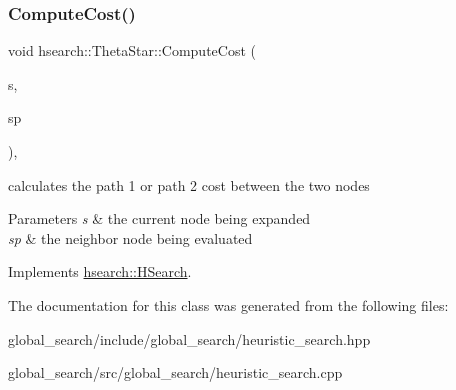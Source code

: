 \subsubsection{\texorpdfstring{Compute\+Cost()}{ComputeCost()}}
{\footnotesize\ttfamily void hsearch\+::\+Theta\+Star\+::\+Compute\+Cost (\begin{DoxyParamCaption}\item[{\hyperlink{structhsearch_1_1SearchNode}{Search\+Node} \&}]{s,  }\item[{\hyperlink{structhsearch_1_1SearchNode}{Search\+Node} \&}]{sp }\end{DoxyParamCaption})\hspace{0.3cm}{\ttfamily [protected]}, {\ttfamily [virtual]}}



calculates the path 1 or path 2 cost between the two nodes 


\begin{DoxyParams}{Parameters}
{\em s} & the current node being expanded \\
\hline
{\em sp} & the neighbor node being evaluated \\
\hline
\end{DoxyParams}


Implements \hyperlink{classhsearch_1_1HSearch_a5d325955c4faedaca0c68155fd1f7e69}{hsearch\+::\+H\+Search}.



The documentation for this class was generated from the following files\+:\begin{DoxyCompactItemize}
\item 
global\+\_\+search/include/global\+\_\+search/heuristic\+\_\+search.\+hpp\item 
global\+\_\+search/src/global\+\_\+search/heuristic\+\_\+search.\+cpp\end{DoxyCompactItemize}
